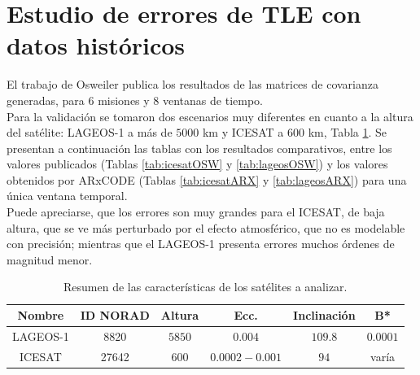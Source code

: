 \begin{table}[!h]
\caption{Resultados del Systems Tool Kit (STK) propagando el mismo TLE que ARxCODE.}
\centering
{}
\end{table}



\section{Estudio de errores de TLE con datos hist\'oricos}

El trabajo de Osweiler publica los resultados de las matrices de covarianza generadas, para 6 misiones y 8 ventanas de tiempo.\\
Para la validaci\'on se tomaron dos escenarios muy diferentes en cuanto a la altura del sat\'elite: LAGEOS-1 a m\'as de $5000$ km y ICESAT a $600 $ km, Tabla \ref{tab:satescenarios}.
Se presentan a continuaci\'on las tablas con los resultados comparativos, entre los valores publicados (Tablas \ref{tab:icesatOSW} y \ref{tab:lageosOSW}) y los valores obtenidos por ARxCODE (Tablas \ref{tab:icesatARX} y \ref{tab:lageosARX}) para una \'unica ventana temporal.\\
Puede apreciarse, que los errores son muy grandes para el ICESAT, de baja altura, que se ve m\'as perturbado por el efecto atmosf\'erico, que no es modelable con precisión; mientras que el LAGEOS-1 presenta errores muchos \'ordenes de magnitud menor.\\

\begin{table}
\caption[Sat\'elites de Estudio]{Resumen de las caracter\'isticas de los sat\'elites a analizar.}

      \begin{tabular}{cccccc}
      \hline
      Nombre & ID NORAD & Altura & Ecc. & Inclinaci\'on & B* \\
      \hline
      LAGEOS-1 & 8820 & $5850$ & $0.004$ & $109.8$ & $0.0001$ \\
      ICESAT & 27642 & $600$ & $0.0002 - 0.001$ & $94$ & var\'ia \\
      \hline
      \end{tabular}
    \label{tab:satescenarios}
\end{table}

